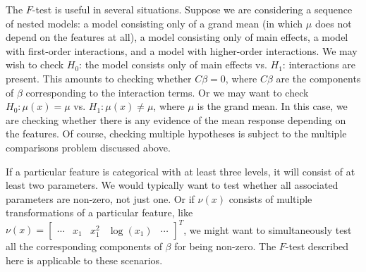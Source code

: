 \documentclass[12pt]{article}
\begin{document}
The $F$-test is useful in several situations. Suppose we are considering a sequence of nested models: a model consisting only of a grand mean (in which $\mu$ does not depend on the features at all), a model consisting only of main effects, a model with first-order interactions, and a model with higher-order interactions. We may wish to check $H_0$: the model consists only of main effects vs. $H_1$: interactions are present. This amounts to checking whether $C \beta = 0$, where $C \beta$ are the components of $\beta$ corresponding to the interaction terms. Or we may want to check $H_0: \mu(x) = \mu$ vs. $H_1: \mu(x) \neq \mu$, where $\mu$ is the grand mean. In this case, we are checking whether there is any evidence of the mean response depending on the features. Of course, checking multiple hypotheses is subject to the multiple comparisons problem discussed above.

If a particular feature is categorical with at least three levels, it will consist of at least two parameters. We would typically want to test whether all associated parameters are non-zero, not just one. Or if $\nu(x)$ consists of multiple transformations of a particular feature, like $\nu(x) = \begin{bmatrix} \cdots & x_1 & x_1^2 & \log(x_1) & \cdots \end{bmatrix}^T$, we might want to simultaneously test all the corresponding components of $\beta$ for being non-zero. The $F$-test described here is applicable to these scenarios.
\end{document}
